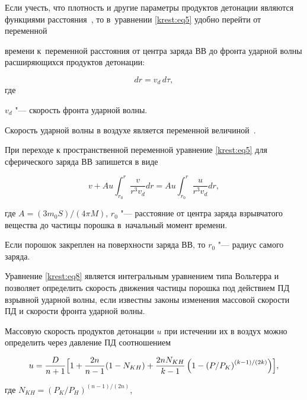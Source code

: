 Если учесть, что плотность и другие параметры продуктов детонации являются функциями расстояния~\cite{krest:bib3}, то в~уравнении \eqref{krest:eq5} удобно перейти от переменной

времени к~переменной расстояния от центра заряда ВВ до фронта ударной волны расширяющихся продуктов детонации: 

$$dr=v_d  \,  d\tau ,$$ где 

$v_d $ "--- скорость фронта ударной волны. 

Скорость ударной волны в воздухе является переменной величиной~\cite{krest:bib4}. 

При переходе к пространственной переменной уравнение \eqref{krest:eq5} для сферического заряда ВВ запишется в виде

\begin{equation}

\label{krest:eq8}

v+A u  \int_{r_0}^r \frac{v}{r^3 v_d }dr = A u \int_{r_0}^r \frac{u}{r^3  v_d}dr,

\end{equation}

где $A=(3 m_0 S)/(4 \pi M)$, $r_0$ "--- расстояние от центра заряда взрывчатого вещества до частицы порошка в~начальный момент времени. 

Если порошок закреплен на поверхности заряда ВВ, то $r_0$ "--- радиус самого заряда.



Уравнение \eqref{krest:eq8} является интегральным уравнением типа Вольтерра и позволяет определить скорость движения частицы порошка под действием ПД взрывной ударной волны, если известны законы изменения массовой скорости ПД и скорости фронта ударной волны.



Массовую скорость продуктов детонации $u$ при истечении их в воздух можно определить через давление ПД соотношением~\cite{krest:bib4}

\begin{equation}

\label{krest:eq9}

u=\frac{D}{n+1}\Bigl[

1+\frac{2 n}{n-1} (1-N_{KH} )+\frac{2 n N_{KH}}{k-1} 

\left( 1-\left( {P}/{P_K } \right)^{(k-1)/(2k)}\right) \Bigr],

\end{equation}

где $N_{KH} =\left({P_K }/{P_H }\right)^{({n-1})/(2n)}$,


